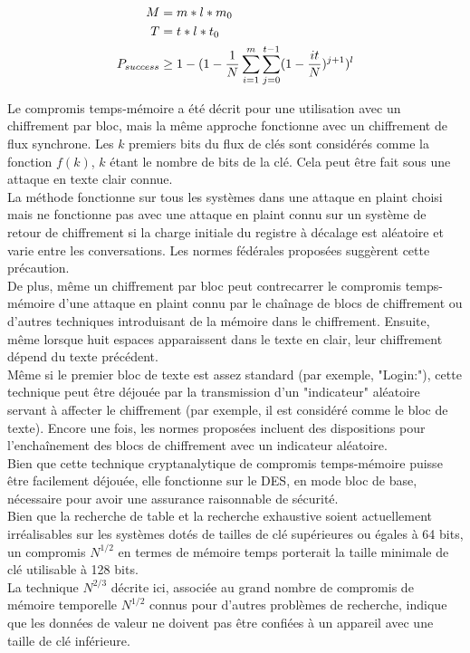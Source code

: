 	\begin{align*}
		M &= m*l*m_0\\
		T &= t*l*t_0\\
		P_{success} &\ge{} 1 - (1 - \frac{1}{N} \sum\limits_{i=1}^{m}\sum\limits_{j=0}^{t-1} (1 - \frac{it}{N})^{j+1})^l
	\end{align*}

	Le compromis temps-mémoire a été décrit pour une utilisation avec un chiffrement par bloc\cite{ehellman}, mais la même approche fonctionne avec un chiffrement de flux synchrone\cite{ehellman}. Les $k$ premiers bits du flux de clés sont considérés comme la fonction $f(k)$, $k$ étant le nombre de bits de la clé. Cela peut être fait sous une attaque en texte clair connue.\\

	La méthode fonctionne sur tous les systèmes dans une attaque en \gls{plaint} choisi mais ne fonctionne pas avec une attaque en \gls{plaint} connu sur un système de retour de chiffrement si la charge initiale du registre à décalage est aléatoire et varie entre les conversations. Les normes fédérales proposées\cite{ehellman} suggèrent cette précaution.\\

	De plus, même un chiffrement par bloc peut contrecarrer le compromis temps-mémoire d'une attaque en \gls{plaint} connu par le chaînage de blocs de chiffrement ou d'autres techniques introduisant de la mémoire dans le chiffrement. Ensuite, même lorsque huit espaces apparaissent dans le texte en clair, leur chiffrement dépend du texte précédent.\\

	Même si le premier bloc de texte est assez standard (par exemple, "Login:"), cette technique peut être déjouée par la transmission d'un "indicateur" aléatoire servant à affecter le chiffrement (par exemple, il est considéré comme le bloc de texte). Encore une fois, les normes proposées\cite{ehellman} incluent des dispositions pour l'enchaînement des blocs de chiffrement avec un indicateur aléatoire.\\

	Bien que cette technique cryptanalytique de compromis temps-mémoire puisse être facilement déjouée, elle fonctionne sur le DES, en mode bloc de base, nécessaire pour avoir une assurance raisonnable de sécurité.\\

	Bien que la recherche de table et la recherche exhaustive soient actuellement irréalisables sur les systèmes dotés de tailles de clé supérieures ou égales à 64 bits, un compromis $N^{1/2}$ en termes de mémoire temps porterait la taille minimale de clé utilisable à 128 bits.\\

	La technique $N^{2/3}$ décrite ici, associée au grand nombre de compromis de mémoire temporelle $N^{1/2}$ connus pour d’autres problèmes de recherche, indique que les données de valeur ne doivent pas être confiées à un appareil avec une taille de clé inférieure.

	\clearpage

\endinput{}
